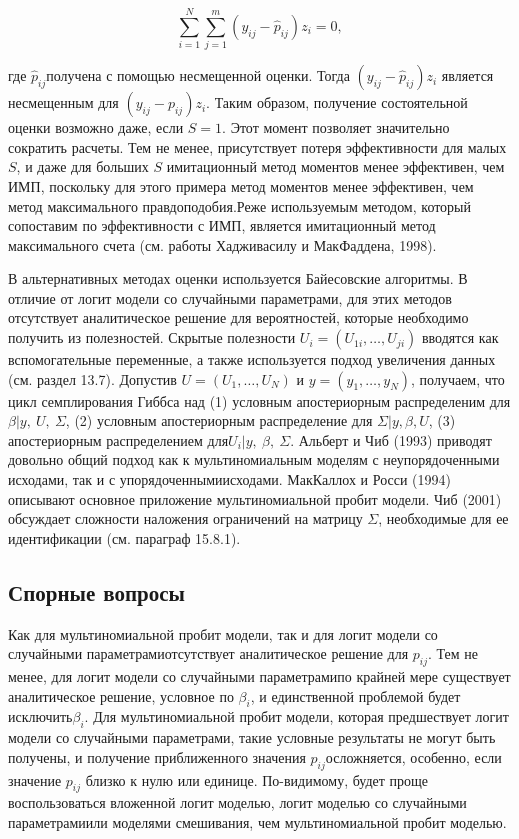 \[\sum^N_{i=1}{\sum^m_{j=1}{\left(y_{ij}-{\hat{p}}_{ij}\right)z_i=0}},\] 

где ${\hat{p}}_{ij}$получена с помощью несмещенной оценки. Тогда $\left(y_{ij}-{\hat{p}}_{ij}\right)z_i$ является несмещенным для $\left(y_{ij}-p_{ij}\right)z_i$. Таким образом, получение состоятельной оценки возможно даже, если $S=1$. Этот момент позволяет значительно сократить расчеты. Тем не менее, присутствует потеря эффективности для малых $S$, и даже для больших $S$ имитационный метод моментов менее эффективен, чем ИМП, поскольку для этого примера метод моментов менее эффективен, чем метод максимального правдоподобия.Реже используемым методом, который сопоставим по эффективности с ИМП, является имитационный метод максимального счета (см. работы Хадживасилу и МакФаддена, 1998).

В альтернативных методах оценки используется Байесовские алгоритмы. В отличие от логит модели со случайными параметрами, для этих методов отсутствует аналитическое решение для вероятностей, которые необходимо получить из полезностей. Скрытые полезности $U_i=(U_{1i},\dots ,U_{ji})$ вводятся как вспомогательные переменные, а также используется подход увеличения данных (см. раздел 13.7). Допустив $U=(U_1,\dots ,U_N)$ и $y=(y_1,\dots ,y_N)$, получаем, что цикл семплирования Гиббса над (1) условным апостериорным распределеним для $\beta |y,\ U,\ \Sigma $, (2) условным апостериорным распределение для $\Sigma |y,\beta ,U$, (3) апостериорным распределением для$U_i|y,\ \beta ,\ \Sigma $. Альберт и Чиб (1993) приводят довольно общий подход как к мультиномиальным моделям с неупорядоченными исходами, так и с упорядоченнымиисходами. МакКаллох и Росси (1994) описывают основное приложение мультиномиальной пробит модели. Чиб (2001) обсуждает сложности наложения ограничений на матрицу $\Sigma $, необходимые для ее идентификации (см. параграф 15.8.1).

\subsection{Спорные вопросы}

Как для мультиномиальной пробит модели, так и для логит модели со случайными параметрамиотсутствует аналитическое решение для $p_{ij}$. Тем не менее, для логит модели со случайными параметрамипо крайней мере существует аналитическое решение, условное по ${\beta }_i$, и единственной проблемой будет исключить${\beta }_i$. Для мультиномиальной пробит модели, которая предшествует логит модели со случайными параметрами, такие условные результаты не могут быть получены, и получение приближенного значения $p_{ij}$осложняется, особенно, если значение $p_{ij}$ близко к нулю или единице. По-видимому, будет проще воспользоваться вложенной логит моделью, логит моделью со случайными параметрамиили моделями смешивания, чем мультиномиальной пробит моделью.

